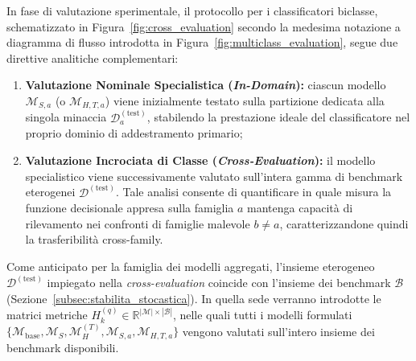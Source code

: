 In fase di valutazione sperimentale, il protocollo per i classificatori biclasse, schematizzato in Figura~\ref{fig:cross_evaluation} secondo la medesima notazione a diagramma di flusso introdotta in Figura~\ref{fig:multiclass_evaluation}, segue due direttive analitiche complementari:
\begin{enumerate}
    \item \textbf{Valutazione Nominale Specialistica (\textit{In-Domain}):} ciascun modello $\mathcal{M}_{S, a}$ (o $\mathcal{M}_{H, T, a}$) viene inizialmente testato sulla partizione dedicata alla singola minaccia $\mathcal{D}_a^{(\text{test})}$, stabilendo la prestazione ideale del classificatore nel proprio dominio di addestramento primario;
    \item \textbf{Valutazione Incrociata di Classe (\textit{Cross-Evaluation}):} il modello specialistico viene successivamente valutato sull'intera gamma di benchmark eterogenei $\mathcal{D}^{(\text{test})}$. Tale analisi consente di quantificare in quale misura la funzione decisionale appresa sulla famiglia $a$ mantenga capacità di rilevamento nei confronti di famiglie malevole $b\neq a$, caratterizzandone quindi la trasferibilità cross-family.
\end{enumerate}

Come anticipato per la famiglia dei modelli aggregati, l'insieme eterogeneo $\mathcal{D}^{(\text{test})}$ impiegato nella \textit{cross-evaluation} coincide con l'insieme dei benchmark $\mathcal{B}$ (Sezione~\ref{subsec:stabilita_stocastica}). In quella sede verranno introdotte le matrici metriche $H_k^{(q)} \in \mathbb{R}^{|\mathcal{M}|\times|\mathcal{B}|}$, nelle quali tutti i modelli formulati $\{\mathcal{M}_{\text{base}}, \mathcal{M}_S, \mathcal{M}_H^{(T)}, \mathcal{M}_{S,a}, \mathcal{M}_{H,T,a}\}$ vengono valutati sull'intero insieme dei benchmark disponibili.

